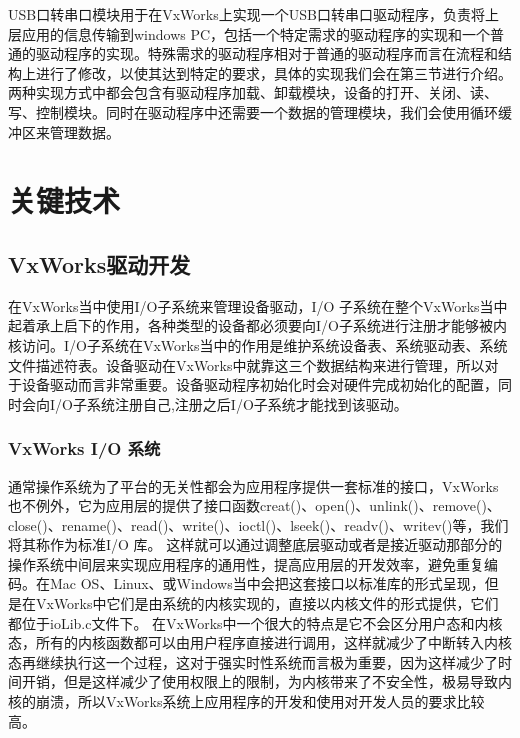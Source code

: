 	USB口转串口模块用于在VxWorks上实现一个USB口转串口驱动程序，负责将上层应用的信息传输到windows PC，包括一个特定需求的驱动程序的实现和一个普通的驱动程序的实现。特殊需求的驱动程序相对于普通的驱动程序而言在流程和结构上进行了修改，以使其达到特定的要求，具体的实现我们会在第三节进行介绍。两种实现方式中都会包含有驱动程序加载、卸载模块，设备的打开、关闭、读、写、控制模块。同时在驱动程序中还需要一个数据的管理模块，我们会使用循环缓冲区来管理数据。


\section{关键技术}

\subsection{VxWorks驱动开发}
	
	在VxWorks当中使用I/O子系统来管理设备驱动，I/O 子系统在整个VxWorks当中起着承上启下的作用，各种类型的设备都必须要向I/O子系统进行注册才能够被内核访问\cite{VxWorks内核解读}\cite{曹桂平2011VxWorks}。I/O子系统在VxWorks当中的作用是维护系统设备表、系统驱动表、系统文件描述符表。设备驱动在VxWorks中就靠这三个数据结构来进行管理，所以对于设备驱动而言非常重要。设备驱动程序初始化时会对硬件完成初始化的配置，同时会向I/O子系统注册自己,注册之后I/O子系统才能找到该驱动。

\subsubsection{VxWorks I/O 系统}
	通常操作系统为了平台的无关性都会为应用程序提供一套标准的接口，VxWorks也不例外，它为应用层的提供了接口函数creat()、open()、unlink()、remove()、close()、rename()、read()、write()、ioctl()、lseek()、readv()、writev()等\cite{陈洋2007VxWorks}\cite{Wu2008Implementation}\cite{Zhang2010Design}，我们将其称作为标准I/O 库。
	这样就可以通过调整底层驱动或者是接近驱动那部分的操作系统中间层来实现应用程序的通用性，提高应用层的开发效率，避免重复编码。在Mac OS、Linux、或Windows当中会把这套接口以标准库的形式呈现，但是在VxWorks中它们是由系统的内核实现的，直接以内核文件的形式提供，它们都位于ioLib.c文件下\cite{VxWorks内核解读}。
	在VxWorks中一个很大的特点是它不会区分用户态和内核态，所有的内核函数都可以由用户程序直接进行调用，这样就减少了中断转入内核态再继续执行这一个过程，这对于强实时性系统而言极为重要，因为这样减少了时间开销，但是这样减少了使用权限上的限制，为内核带来了不安全性，极易导致内核的崩溃，所以VxWorks系统上应用程序的开发和使用对开发人员的要求比较高。
		
